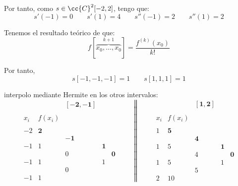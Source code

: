 \begin{ejercicio}
    Por tanto, como $s\in \cc{C}^2[-2,2]$, tengo que:
    \begin{equation*}
        s'(-1)=0 \qquad s'(1)=4 \qquad s''(-1)=2 \qquad s''(1)=2
    \end{equation*}

    Tenemos el resultado teórico de que:
    \begin{equation*}
        f[\overbrace{x_0,\dots,x_0}^{k+1}] = \frac{f^{(k)}(x_0)}{k!}
    \end{equation*}

    Por tanto,
    \begin{equation*}
        s[-1,-1,-1]=1 \qquad s[1,1,1]=1
    \end{equation*}
    
    interpolo mediante Hermite en los otros intervalos:
    \begin{equation*}
        \begin{array}{c|cccc}
            &&\mathbf{[-2, -1]} \\ \\
            x_i & f(x_i) \\ \\
            -2 & \mathbf{2} \\
            && \mathbf{-1}\\
            -1 & 1 && \mathbf{1}\\
            && 0 && \mathbf{0}\\ 
            -1 & 1 && 1\\
            && 0\\
            -1 & 1
        \end{array}
        \qquad \left\|\qquad
        \begin{array}{c|cccc}
            &&\mathbf{[1, 2]} \\ \\
            x_i & f(x_i) \\ \\
            1 & \mathbf{5} \\
            && \mathbf{4}\\
            1 & 5 && \mathbf{1}\\
            && 4 && \mathbf{0}\\ 
            1 & 5 && 1\\
            && 5\\
            2 & 10
        \end{array}\right.
    \end{equation*}



\end{ejercicio}
